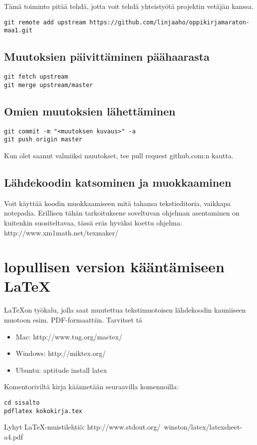 Tämä toiminto pitää tehdä, jotta voit tehdä yhteistyötä projektin vetäjän kanssa.

\begin{verbatim}
git remote add upstream https://github.com/linjaaho/oppikirjamaraton-maa1.git
\end{verbatim}

\subsection{Muutoksien päivittäminen päähaarasta}

\begin{verbatim}
git fetch upstream
git merge upstream/master
\end{verbatim}

\subsection{Omien muutoksien lähettäminen}

\begin{verbatim}
git commit -m "<muutoksen kuvaus>" -a
git push origin master
\end{verbatim}

Kun olet saanut valmiiksi muutokset, tee pull request github.com:n kautta.

\subsection{Lähdekoodin katsominen ja muokkaaminen}

Voit käyttää koodin muokkaamiseen mitä tahansa tekstieditoria, vaikkapa notepadia. Erillisen tähän tarkoituksene soveltuvan ohjelman asentaminen on kuitenkin suositeltavaa, tässä eräs hyväksi koettu ohjelma: http://www.xm1math.net/texmaker/

\section{lopullisen version kääntämiseen \LaTeX}

\LaTeX on työkalu, jolla saat muutettua tekstimuotoisen lähdekoodin kauniiseen muotoon esim. PDF-formaattiin. Tarvitset tä

\begin{itemize}

\item Mac: http://www.tug.org/mactex/
\item Windows: http://miktex.org/
\item Ubuntu: aptitude install latex

\end{itemize}

Komentoriviltä kirja käännetään seuraavilla komennoilla:

\begin{verbatim}
cd sisalto
pdflatex kokokirja.tex
\end{verbatim}

Lyhyt \LaTeX -muistilehtiö: http://www.stdout.org/~winston/latex/latexsheet-a4.pdf


